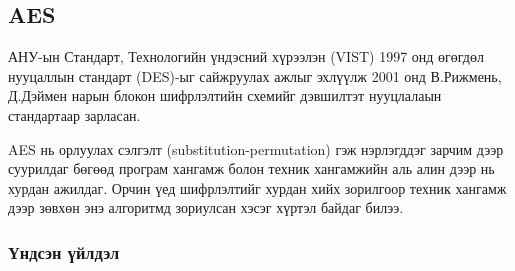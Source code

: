 \subsection{AES}
АНУ-ын Стандарт, Технологийн үндэсний хүрээлэн (VIST) 1997 онд өгөгдөл нууцаллын стандарт (DES)-ыг сайжруулах ажлыг эхлүүлж 2001 онд В.Рижмень, Д.Дэймен нарын блокон шифрлэлтийн схемийг дэвшилтэт нууцлалаын стандартаар зарласан.\cite{intro_crypo}

AES нь орлуулах сэлгэлт (substitution-permutation) гэж нэрлэгддэг зарчим дээр суурилдаг бөгөөд програм хангамж болон техник хангамжийн аль алин дээр нь хурдан ажилдаг. Орчин үед шифрлэлтийг хурдан хийх зорилгоор техник хангамж дээр зөвхөн энэ алгоритмд зориулсан хэсэг хүртэл байдаг билээ.
\subsubsection{Үндсэн үйлдэл}
